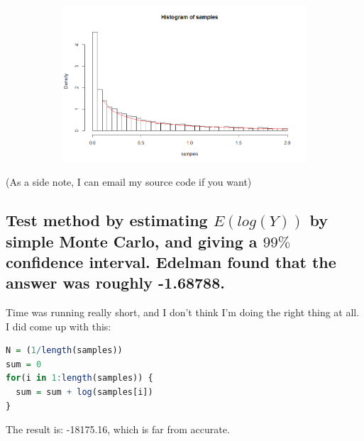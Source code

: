 \documentclass[20pt]{article} %
\begin{document}
\newpage
\begin{figure}[!htbp]
  	\centering
   	\begin{subfigure}[p]{0.8\linewidth}
    	\includegraphics[width=\linewidth]{./figures/Rplot03.png}
   	\end{subfigure}
\end{figure} 

(As a side note, I can email my source code if you want)

\subsection{Test method by estimating $\!E(log(Y))$ by simple Monte Carlo, and giving a $99\%$ confidence interval. Edelman found that the answer was roughly -1.68788.}

Time was running really short, and I don't think I'm doing the right thing at all.  I  did come up with this:

\begin{lstlisting}[language=R]
N = (1/length(samples))
sum = 0
for(i in 1:length(samples)) {
  sum = sum + log(samples[i])
}
\end{lstlisting}
The result is: -18175.16, which is far from accurate.
\end{document}
